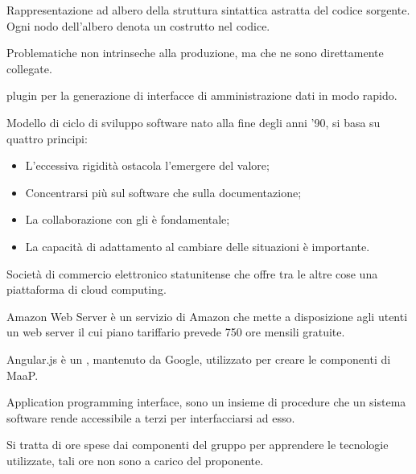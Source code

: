 





\makeFrontPage



\clearpage


Rappresentazione ad albero della struttura sintattica astratta del codice sorgente. Ogni nodo dell'albero denota un costrutto nel codice.

Problematiche non intrinseche alla produzione, ma che ne sono direttamente collegate.

 plugin per la generazione di interfacce di amministrazione dati in modo rapido.

Modello di ciclo di sviluppo software nato alla fine degli anni '90, si basa su quattro principi:
\begin{itemize} 
 \item L'eccessiva rigidità ostacola l'emergere del valore;
 \item Concentrarsi più sul software che sulla documentazione;
 \item La collaborazione con gli  è fondamentale;
 \item La capacità di adattamento al cambiare delle situazioni è importante.
\end{itemize} 

Società di commercio elettronico statunitense che offre tra le altre cose una piattaforma di cloud computing.

Amazon Web Server è un servizio di Amazon che mette a disposizione agli utenti un web server il cui piano tariffario prevede 750 ore mensili gratuite.

Angular.js è un   , mantenuto da Google, utilizzato per creare le componenti  di MaaP.

Application programming interface, sono un insieme di procedure che un sistema software rende accessibile a terzi per interfacciarsi ad esso.

Si tratta di ore spese dai componenti del gruppo per apprendere le tecnologie utilizzate, tali ore non sono a carico del proponente.


